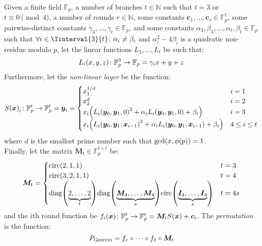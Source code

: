\begin{definition}
  Given a finite field \(\mathbb{F}_p\), a number of branches \(t \in \mathbb{N}\) such that 
  \(t = 3\) or \(t \equiv 0 \pmod{4}\), a number of rounds \(r \in \mathbb{N}\), some constants 
  \(\bm{c}_{1}, \dots, \bm{c}_{r} \in \mathbb{F}_{p}^{t}\), some pairwise-distinct 
  constants \(\gamma_3, \dots, \gamma_t \in \mathbb{F}_{p}\), and some constants 
  \(\alpha_3, \beta_3, \dots, \alpha_t, \beta_t \in \mathbb{F}_{p}\) such that 
  \(\forall i \in \Iinterval{3}{t}\colon \alpha_i \neq \beta_i\) and 
  \(\alpha_{i}^{2} - 4\beta_{i}\) is a quadratic non-residue modulo \(p\), 
  let the linear functions \(L_3, \dots, L_t\) be such that:
  \[\call{L_i}{x, y, z}\colon \mathbb{F}_p^3 \to \mathbb{F}_p = \gamma_{i}x + y + z\]
  Furthermore, let the \emph{non-linear layer} be the function:
  \[
    \call{S}{\bm{x}}_i\colon \mathbb{F}_{p}^{t} \to \mathbb{F}_{p}^{t} = \bm{y}_i =
    \begin{cases}
      x_{1}^{1/d}                                                         & i = 1         \\
      x_{2}^{d}                                                           & i = 2         \\
      x_{i}\Parens*{\call{L_i}{\bm{y}_0, \bm{y}_1, 0}^{2} + 
      \alpha_{i}\call{L_i}{\bm{y}_0, \bm{y}_1, 0} + \beta_i}              & i = 3         \\
      x_{i}\Parens*{\call{L_i}{\bm{y}_0, \bm{y}_1, \bm{x}_{i-1}}^{2} + 
      \alpha_{i}\call{L_i}{\bm{y}_0, \bm{y}_1, \bm{x}_{i-1}} + \beta_i}   & 4 \le i \le t
    \end{cases}
  \]
  where \(d\) is the smallest prime number such that \(\call{\gcd}{x, \call{\totient}{p}} = 1\).\\
  Finally, let the matrix \(\bm{M}_t \in \mathbb{F}_p^{t \times t}\) be:
  \[
    \bm{M}_t = 
    \begin{cases}
      \call{\circulant}{2, 1, 1} & t = 3 \\  
      \call{\circulant}{3, 2, 1, 1} & t = 4 \\
      \call{\diag}{\underbrace{2, \dots, 2}_{t}}
      \call{\diag}{\underbrace{\bm{M}_{4}, \dots, \bm{M}_4}_{s}}
      \call{\circulant}{\underbrace{\bm{I}_4, \dots, \bm{I}_4}_{s}}
      & t = 4s
    \end{cases}
  \]
  and the \(i\)th round function be
  \(\call{f_i}{\bm{x}}\colon \mathbb{F}_{p}^{t} \to \mathbb{F}_{p}^{t} = 
    \bm{M}_{t}\call{S}{\bm{x}} + \bm{c}_i\).
  The \emph{\Griffin{} permutation} is the function:
  \[
    P_{\textnormal{\textsc{Griffin}}} = f_{r} \circ \cdots \circ f_{1} \circ \bm{M}_{t}
  \]
\end{definition}

